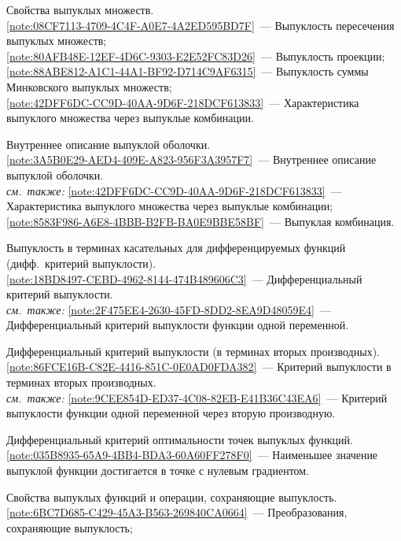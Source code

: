 \begin{description}[font=\normalfont\bfseries]
\item[Т1.] Свойства выпуклых множеств.\\
  \cref{note:08CF7113-4709-4C4F-A0E7-4A2ED595BD7F}~--- Выпуклость пересечения выпуклых множеств;\\
  \cref{note:80AFB48E-12EF-4D6C-9303-E2E52FC83D26}~--- Выпуклость проекции;\\
  \cref{note:88ABE812-A1C1-44A1-BF92-D714C9AF6315}~--- Выпуклость суммы Минковского выпуклых множеств;\\
  \cref{note:42DFF6DC-CC9D-40AA-9D6F-218DCF613833}~--- Характеристика выпуклого множества через выпуклые комбинации.
\item[Т2.] Внутреннее описание выпуклой оболочки.\\
  \cref{note:3A5B0E29-AED4-409E-A823-956F3A3957F7}~--- Внутреннее описание выпуклой оболочки.\\
  \emph{см.\ также:} \cref{note:42DFF6DC-CC9D-40AA-9D6F-218DCF613833}~--- Характеристика выпуклого множества через выпуклые комбинации; \cref{note:8583F986-A6E8-4BBB-B2FB-BA0E9BBE58BF}~--- Выпуклая комбинация.
\item[Т3.] Выпуклость в терминах касательных для дифференцируемых функций (дифф.\ критерий выпуклости).\\
  \cref{note:18BD8497-CEBD-4962-8144-474B489606C3}~--- Дифференциальный критерий выпуклости.\\
  \emph{см.\ также:} \cref{note:2F475EE4-2630-45FD-8DD2-8EA9D48059E4}~--- Дифференциальный критерий выпуклости функции одной переменной.
\item[Т4.] Дифференциальный критерий выпуклости (в терминах вторых производных).\\
  \cref{note:86FCE16B-C82E-4416-851C-0E0AD0FDA382}~--- Критерий выпуклости в терминах вторых производных.\\
  \emph{см.\ также:} \cref{note:9CEE854D-ED37-4C08-82EB-E41B36C43EA6}~--- Критерий выпуклости функции одной переменной через вторую производную.
\item[Т5.] Дифференциальный критерий оптимальности точек выпуклых функций.\\
  \cref{note:035B8935-65A9-4BB4-BDA3-60A60FF278F0}~--- Наименьшее значение выпуклой функции достигается в точке с нулевым градиентом.
\item[Т6.] Свойства выпуклых функций и операции, сохраняющие выпуклость.\\
  \cref{note:6BC7D685-C429-45A3-B563-269840CA0664}~--- Преобразования, сохраняющие выпуклость;\\

\end{description}
